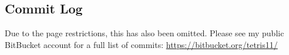 %

%

%

%

%

%

%

\subsection{Commit Log}\label{commits}
Due to the page restrictions, this has also been omitted. Please see my public BitBucket account for a full list of commits:
\tab\url{https://bitbucket.org/tetris11/}

